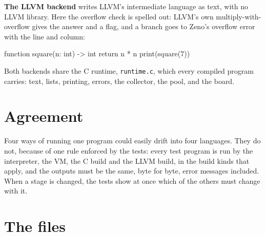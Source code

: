 \textbf{The LLVM backend} writes LLVM's intermediate language as text,
with no LLVM library. Here the overflow check is spelled out: LLVM's
own multiply-with-overflow gives the answer and a flag, and a branch
goes to Zeno's overflow error with the line and column:

\begin{zeno}[file=square.zeno, dir=sq, show=no, cmd=zeno build --llvm {file} > /dev/null ;; grep -A13 "define internal i64 @z_square" square.ll]
function square(n: int) -> int {
    return n * n
}
print(square(7))
\end{zeno}

Both backends share the C runtime, \verb|runtime.c|, which every
compiled program carries: text, lists, printing, errors, the collector,
the pool, and the board.

\section{Agreement}

Four ways of running one program could easily drift into four
languages. They do not, because of one rule enforced by the tests:
every test program is run by the interpreter, the VM, the C build and
the LLVM build, in the build kinds that apply, and the outputs must be
the same, byte for byte, error messages included. When a stage is
changed, the tests show at once which of the others must change with
it.

\section{The files}


